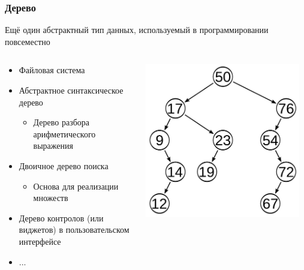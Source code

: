 \documentclass{../../slides-style}
\begin{document}
    
    \begin{frame}[plain]
        \titlepage
    \end{frame}
    
    \begin{frame}
        \frametitle{Дерево}
        Ещё один абстрактный тип данных, используемый в программировании повсеместно
        \begin{columns}
            \begin{column}{0.55\textwidth}
                \begin{itemize}
                    \item Файловая система
                    \item Абстрактное синтаксическое дерево
                    \begin{itemize}
                        \item Дерево разбора арифметического выражения
                    \end{itemize}
                    \item Двоичное дерево поиска
                    \begin{itemize}
                        \item Основа для реализации множеств
                    \end{itemize}
                    \item Дерево контролов (или виджетов) в пользовательском интерфейсе
                    \item ...
                \end{itemize}
            \end{column}
            \begin{column}{0.45\textwidth}
                \begin{center}
                    \includegraphics[width=0.95\textwidth]{tree.png}
                \end{center}
            \end{column}
        \end{columns}
    \end{frame}
\end{document}
